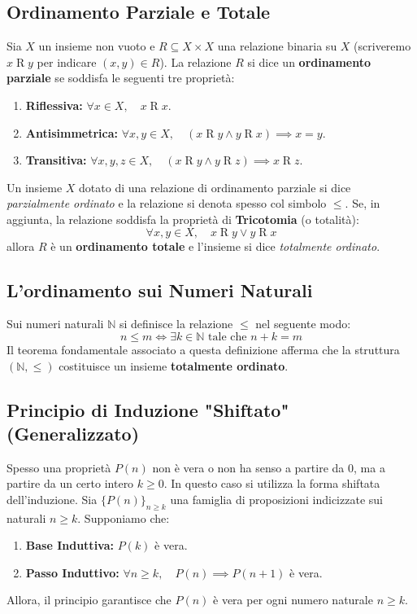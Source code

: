 \documentclass[12pt, a4paper]{article}
\begin{document}
\subsection{Ordinamento Parziale e Totale}
Sia $X$ un insieme non vuoto e $R \subseteq X \times X$ una relazione binaria su $X$ (scriveremo $x \mathrel{R} y$ per indicare $(x,y) \in R$). La relazione $R$ si dice un \textbf{ordinamento parziale} se soddisfa le seguenti tre proprietà:
\begin{enumerate}
    \item \textbf{Riflessiva:} $\forall x \in X, \quad x \mathrel{R} x$.
    \item \textbf{Antisimmetrica:} $\forall x, y \in X, \quad (x \mathrel{R} y \land y \mathrel{R} x) \implies x = y$.
    \item \textbf{Transitiva:} $\forall x, y, z \in X, \quad (x \mathrel{R} y \land y \mathrel{R} z) \implies x \mathrel{R} z$.
\end{enumerate}
Un insieme $X$ dotato di una relazione di ordinamento parziale si dice \emph{parzialmente ordinato} e la relazione si denota spesso col simbolo $\leq$.
Se, in aggiunta, la relazione soddisfa la proprietà di \textbf{Tricotomia} (o totalità):
\[ \forall x, y \in X, \quad x \mathrel{R} y \lor y \mathrel{R} x \]
allora $R$ è un \textbf{ordinamento totale} e l'insieme si dice \emph{totalmente ordinato}.

\subsection{L'ordinamento sui Numeri Naturali}
Sui numeri naturali $\mathbb{N}$ si definisce la relazione $\leq$ nel seguente modo:
\[ n \leq m \iff \exists k \in \mathbb{N} \text{ tale che } n + k = m \]
Il teorema fondamentale associato a questa definizione afferma che la struttura $(\mathbb{N}, \leq)$ costituisce un insieme \textbf{totalmente ordinato}.

\subsection{Principio di Induzione "Shiftato" (Generalizzato)}
Spesso una proprietà $P(n)$ non è vera o non ha senso a partire da $0$, ma a partire da un certo intero $k \ge 0$. In questo caso si utilizza la forma shiftata dell'induzione.
Sia $\{P(n)\}_{n \geq k}$ una famiglia di proposizioni indicizzate sui naturali $n \ge k$. Supponiamo che:
\begin{enumerate}
    \item \textbf{Base Induttiva:} $P(k)$ è vera.
    \item \textbf{Passo Induttivo:} $\forall n \ge k, \quad P(n) \implies P(n+1)$ è vera.
\end{enumerate}
Allora, il principio garantisce che $P(n)$ è vera per ogni numero naturale $n \ge k$.
\end{document}

